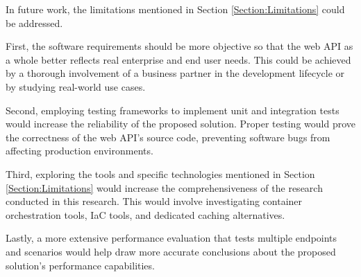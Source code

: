 \documentclass[12pt, reqno]{amsbook}
\theoremstyle{definition}
\theoremstyle{definition}
\numberwithin{section}{chapter}
\numberwithin{table}{chapter}
\numberwithin{figure}{chapter}
\begin{document}
In future work, the limitations mentioned in Section \ref{Section:Limitations} could be addressed.

First, the software requirements should be more objective so that the web \ac{API} as a whole better reflects real enterprise and end user needs. This could be achieved by a thorough involvement of a business partner in the development lifecycle or by studying real-world use cases.

Second, employing testing frameworks to implement unit and integration tests would increase the reliability of the proposed solution. Proper testing would prove the correctness of the web \ac{API}'s source code, preventing software bugs from affecting production environments.

Third, exploring the tools and specific technologies mentioned in Section \ref{Section:Limitations} would increase the comprehensiveness of the research conducted in this research. This would involve investigating container orchestration tools, \ac{IaC} tools, and dedicated caching alternatives.

Lastly, a more extensive performance evaluation that tests multiple endpoints and scenarios would help draw more accurate conclusions about the proposed solution's performance capabilities.

\printbibliography[title={References}]
\end{document}
